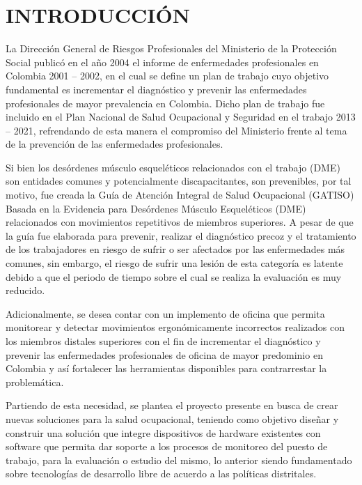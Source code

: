 \newpage
\chapter{INTRODUCCIÓN} 
La Dirección General de Riesgos Profesionales del Ministerio de la Protección Social publicó en el año 2004 el informe de enfermedades profesionales en Colombia 2001 – 2002, en el cual se define un plan de trabajo cuyo objetivo fundamental es incrementar el diagnóstico y prevenir las enfermedades profesionales de mayor prevalencia en Colombia. Dicho plan de trabajo fue incluido en el Plan Nacional de Salud Ocupacional y Seguridad en el trabajo 2013 – 2021, refrendando de esta manera el compromiso del Ministerio frente al tema de la prevención de las enfermedades profesionales.

Si bien los desórdenes músculo esqueléticos relacionados con el trabajo (DME) son entidades comunes y potencialmente discapacitantes, son prevenibles, por tal motivo, fue creada la Guía de Atención Integral de Salud Ocupacional (GATISO) Basada en la Evidencia para Desórdenes Músculo Esqueléticos (DME) relacionados con movimientos repetitivos de miembros superiores. A pesar de que la guía fue elaborada para prevenir, realizar el diagnóstico precoz y el tratamiento de los trabajadores en riesgo de sufrir o ser afectados por las enfermedades más comunes, sin embargo, el riesgo de sufrir una lesión de esta categoría es latente debido a que el periodo de tiempo sobre el cual se realiza la evaluación es muy reducido.

Adicionalmente, se desea contar con un implemento de oficina que permita monitorear y detectar movimientos ergonómicamente incorrectos realizados con los miembros distales superiores con el fin de incrementar el diagnóstico y prevenir las enfermedades profesionales de oficina de mayor predominio en Colombia y así fortalecer las herramientas disponibles para contrarrestar la problemática.

Partiendo de esta necesidad, se plantea el proyecto presente en busca de crear nuevas soluciones para la salud ocupacional, teniendo como objetivo diseñar y construir una solución que integre dispositivos de hardware existentes con software que permita dar soporte a los procesos de monitoreo del puesto de trabajo, para la evaluación o estudio del mismo, lo anterior siendo fundamentado sobre tecnologías de desarrollo libre de acuerdo a las políticas distritales.